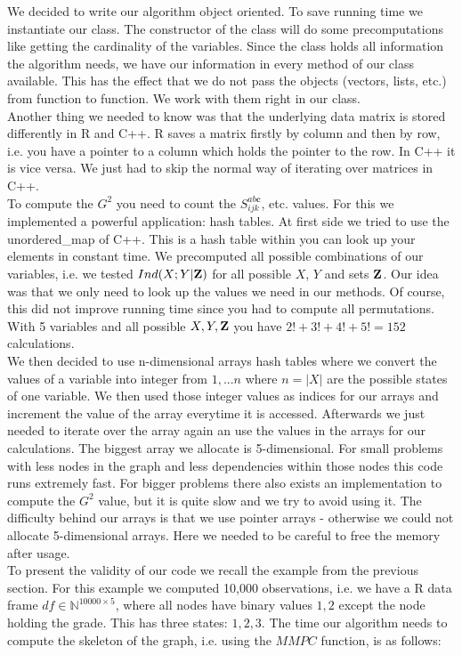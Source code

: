 		We decided to write our algorithm object oriented. To save running time we instantiate our class. The constructor of the class will do some precomputations like getting the cardinality of the variables. Since the class holds all information the algorithm needs, we have our information in every method of our class available. This has the effect that we do not pass the objects (vectors, lists, etc.) from function to function. We work with them right in our class.\\
		Another thing we needed to know was that the underlying data matrix is stored differently in R and C++. R saves a matrix firstly by column and then by row, i.e. you have a pointer to a column which holds the pointer to the row. In C++ it is vice versa. We just had to skip the normal way of iterating over matrices in C++.\\
		To compute the $G^{2}$ you need to count the $S^{ab\textbf{c}}_{ijk}$, etc. values. For this we implemented a powerful application: hash tables. At first side we tried to use the unordered\_map of C++. This is a hash table within you can look up your elements in constant time. We precomputed all possible combinations of our variables, i.e. we tested $Ind(X;Y | {\textbf{Z}})$ for all possible $X$, $Y$ and sets ${\textbf{Z}}$. Our idea was that we only need to look up the values we need in our methods. Of course, this did not improve running time since you had to compute all permutations. With 5 variables and all possible $X, Y, {\textbf{Z}}$ you have $2! + 3! + 4! + 5! = 152$ calculations.\\
		We then decided to use n-dimensional arrays hash tables where we convert the values of a variable into integer from $1,...n$ where $n = |X|$ are the possible states of one variable. We then used those integer values as indices for our arrays and increment the value of the array everytime it is accessed. Afterwards we just needed to iterate over the array again an use the values in the arrays for our calculations. The biggest array we allocate is 5-dimensional. For small problems with less nodes in the graph and less dependencies within those nodes this code runs extremely fast. For bigger problems there also exists an implementation to compute the $G^{2}$ value, but it is quite slow and we try to avoid using it. The difficulty behind our arrays is that we use pointer arrays - otherwise we could not allocate 5-dimensional arrays. Here we needed to be careful to free the memory after usage.\\
		To present the validity of our code we recall the example from the previous section. For this example we computed 10,000 observations, i.e. we have a R data frame $df \in \mathbb{N}^{10000 \times 5}$, where all nodes have binary values $1, 2$ except the node holding the grade. This has three states: $1, 2, 3$. The time our algorithm needs to compute the skeleton of the graph, i.e. using the $MMPC$ function, is as follows:

